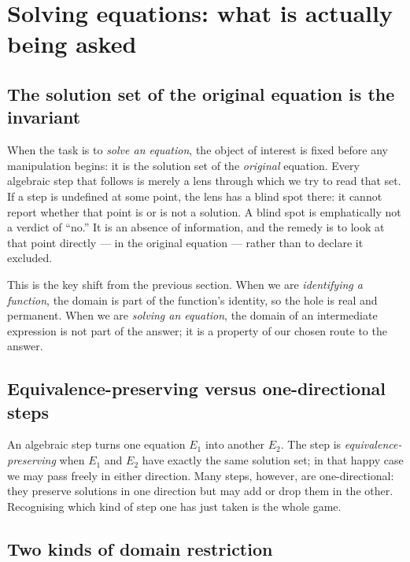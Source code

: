 \documentclass{essay}
\begin{document}
\section{Solving equations: what is actually being asked}

\subsection{The solution set of the original equation is the invariant}

When the task is to \emph{solve an equation}, the object of interest is fixed before any
manipulation begins: it is the solution set of the \emph{original} equation. Every algebraic
step that follows is merely a lens through which we try to read that set. If a step is
undefined at some point, the lens has a blind spot there: it cannot report whether that
point is or is not a solution. A blind spot is emphatically not a verdict of ``no.'' It is
an absence of information, and the remedy is to look at that point directly --- in the
original equation --- rather than to declare it excluded.

This is the key shift from the previous section. When we are \emph{identifying a function},
the domain is part of the function's identity, so the hole is real and permanent. When we
are \emph{solving an equation}, the domain of an intermediate expression is not part of the
answer; it is a property of our chosen route to the answer.

\subsection{Equivalence-preserving versus one-directional steps}

An algebraic step turns one equation $E_1$ into another $E_2$. The step is
\emph{equivalence-preserving} when $E_1$ and $E_2$ have exactly the same solution set; in
that happy case we may pass freely in either direction. Many steps, however, are
one-directional: they preserve solutions in one direction but may add or drop them in the
other. Recognising which kind of step one has just taken is the whole game.

\subsection{Two kinds of domain restriction}
\end{document}
